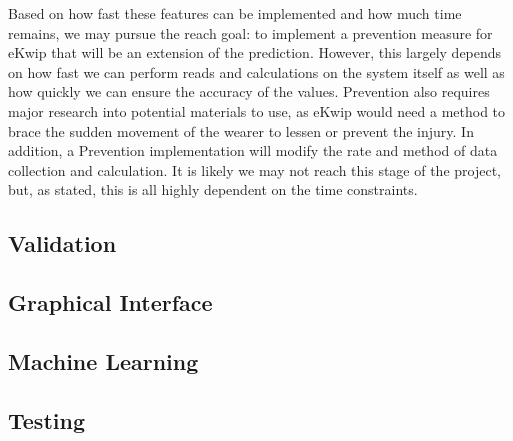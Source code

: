 Based on how fast these features can be implemented and how much time remains, we may pursue the reach goal: to implement a prevention measure for eKwip that will be an extension of the prediction. However, this largely depends on how fast we can perform reads and calculations on the system itself as well as how quickly we can ensure the accuracy of the values. Prevention also requires major research into potential materials to use, as eKwip would need a method to brace the sudden movement of the wearer to lessen or prevent the injury. In addition, a Prevention implementation will modify the rate and method of data collection and calculation. It is likely we may not reach this stage of the project, but, as stated, this is all highly dependent on the time constraints. 

\subsection {Validation}

\subsection {Graphical Interface}

\subsection {Machine Learning}

\subsection {Testing}